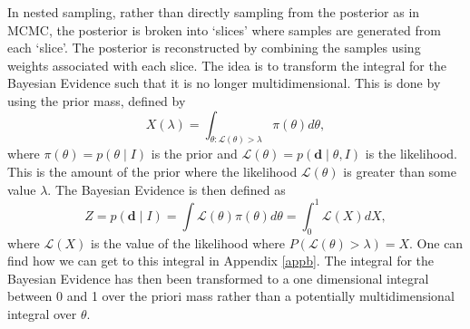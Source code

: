 In nested sampling, rather than directly sampling from the posterior as in \gls{MCMC}, the posterior is broken into `slices' where samples are generated from each `slice'.
The posterior is reconstructed by combining the samples using weights associated with each slice.
The idea is to transform the integral for the Bayesian Evidence such that it is no longer multidimensional.
This is done by using the prior mass, defined by
\begin{equation}
\label{searchcw:bayes:nested:priormass}
X(\lambda) = \int_{\theta: \mathcal{L}(\theta) > \lambda} \pi(\theta) d\theta,
\end{equation}
where $\pi(\theta) = p(\theta \mid I)$ is the prior and $\mathcal{L}(\theta)=p(\bm{d} \mid \theta, I)$ is the likelihood. This is the amount of the prior where the likelihood $\mathcal{L}(\theta)$ is greater than some value $\lambda$.
The Bayesian Evidence is then defined as 
\begin{equation}
\label{searchcw:bayes:nested:evidence}
Z = p(\bm{d} \mid I) = \int \mathcal{L}(\theta) \pi(\theta) d\theta = \int_0^1 \mathcal{L}(X) dX,
\end{equation}
where $\mathcal{L}(X)$ is the value of the likelihood where $P(\mathcal{L}(\theta) > \lambda) = X$. One can find how we can get to this integral in Appendix \ref{appb}.
The integral for the Bayesian Evidence has then been transformed to a one dimensional integral between 0 and 1 over the priori mass rather than a potentially multidimensional integral over $\theta$.

